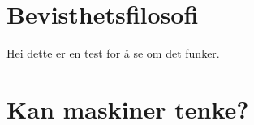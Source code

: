 
\renewcommand{\baselinestretch}{1.5}



\setlength{\parskip}{0em}
\maketitle
\thispagestyle{empty}
\addtocounter{page}{-1}
\newpage
\tableofcontents %
\setlength{\parskip}{1em}
\newpage



\section*{Bevisthetsfilosofi}
\lipsum[1]
Hei dette er en test for å se om det funker.

\section*{Kan maskiner tenke?}
\lipsum[1-2]

\autocite{Kiran2013}

\autocite{Nagel2003}

\printbibliography[heading=bibintoc] %

\newpage
\appendix




